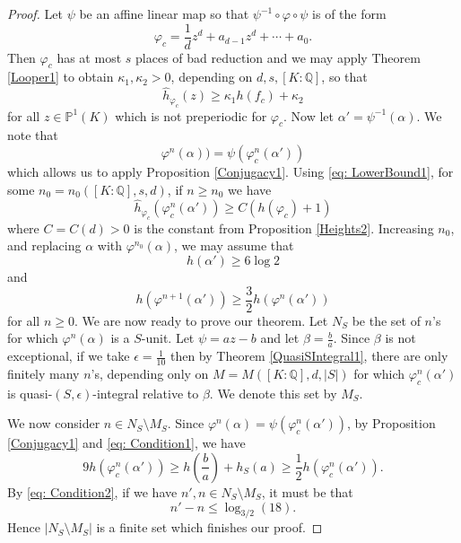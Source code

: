 \documentclass[10pt, reqno]{amsart}
\newcommand{\bb}{\mathbb}
\newcommand{\vphi}{\varphi}
\newcommand{\h}{\widehat{h}}
\numberwithin{theorem}{section}
\numberwithin{equation}{section}
\numberwithin{example}{section}
\numberwithin{definition}{section}
\begin{document}
\begin{proof}
Let $\psi$ be an affine linear map so that $\psi^{-1} \circ \vphi \circ \psi$ is of the form 
$$\vphi_c = \frac{1}{d} z^d + a_{d-1} z^d + \cdots + a_0.$$
Then $\vphi_c$ has at most $s$ places of bad reduction and we may apply Theorem \ref{Looper1} to obtain $\kappa_1,\kappa_2 > 0$, depending on $d,s,[K:\bb{Q}]$, so that
\begin{equation} \label{eq: LowerBound1}
\h_{\vphi_c}(z) \geq \kappa_1 h(f_c) + \kappa_2
\end{equation}
for all $z \in \bb{P}^1(K)$ which is not preperiodic for $\vphi_c$. Now let $\alpha' = \psi^{-1}(\alpha)$. We note that 
$$\vphi^n(\alpha)) = \psi(\vphi_c^n(\alpha'))$$
which allows us to apply Proposition \ref{Conjugacy1}. Using \eqref{eq: LowerBound1}, for some $n_0 = n_0([K:\bb{Q}],s,d)$, if $n \geq n_0$ we have 
$$\h_{\vphi_c}(\vphi_c^n(\alpha')) \geq C(h(\vphi_c)+1)$$
where $C = C(d) > 0$ is the constant from Proposition \ref{Heights2}. Increasing $n_0$, and replacing $\alpha$ with $\vphi^{n_0}(\alpha)$, we may assume that 
\begin{equation} \label{eq: Condition1}
h(\alpha') \geq 6 \log 2
\end{equation}
and 
\begin{equation} \label{eq: Condition2}
h(\vphi^{n+1}(\alpha')) \geq \frac{3}{2} h(\vphi^n(\alpha'))
\end{equation}
for all $n \geq 0$. We are now ready to prove our theorem. Let $N_S$ be the set of $n$'s for which $\vphi^n(\alpha)$ is a $S$-unit. Let $\psi = az-b$ and let $\beta = \frac{b}{a}$. Since $\beta$ is not exceptional, if we take $\epsilon = \frac{1}{10}$ then by Theorem \ref{QuasiSIntegral1}, there are only finitely many $n$'s, depending only on $M = M([K:\bb{Q}],d,|S|)$ for which $\vphi_c^n(\alpha')$ is quasi-$(S,\epsilon)$-integral relative to $\beta$. We denote this set by $M_S$.
\par 
We now consider $n \in N_S \setminus M_S$. Since $\vphi^n(\alpha) = \psi(\vphi_c^n(\alpha'))$, by Proposition \ref{Conjugacy1} and \eqref{eq: Condition1}, we have 
$$9h(\vphi_c^n(\alpha')) \geq h\left(\frac{b}{a} \right) + h_S(a) \geq \frac{1}{2} h(\vphi_c^n(\alpha')).$$
By \eqref{eq: Condition2}, if we have $n',n \in N_S \setminus M_S$, it must be that 
$$n' - n \leq \log_{3/2}(18).$$
Hence $|N_S \setminus M_S|$ is a finite set which finishes our proof. 
\end{proof}




\end{document}
